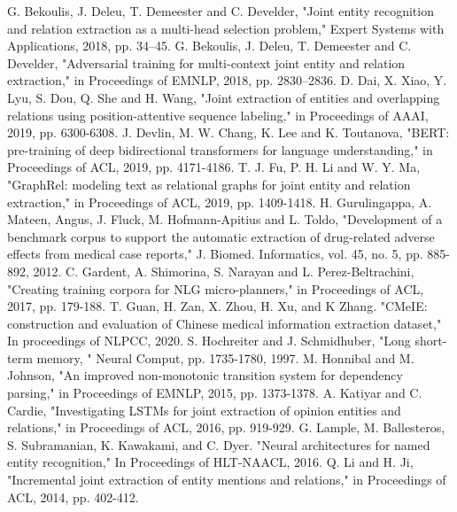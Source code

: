 \documentclass[conference]{IEEEtran}
\begin{document}
%
 \begin{thebibliography}{00}
 G. Bekoulis, J. Deleu, T. Demeester and C. Develder, "Joint entity recognition and relation extraction as a multi-head selection problem," Expert Systems with Applications, 2018, pp. 34--45.
 G. Bekoulis, J. Deleu, T. Demeester and C. Develder, "Adversarial training for multi-context joint entity and relation extraction," in Proceedings of EMNLP, 2018, pp. 2830--2836.
 D. Dai, X. Xiao, Y. Lyu, S. Dou, Q. She and H. Wang, "Joint extraction of entities and overlapping relations using position-attentive sequence labeling," in Proceedings of AAAI, 2019, pp. 6300-6308.
 J. Devlin, M. W. Chang, K. Lee and K. Toutanova, "BERT: pre-training of deep bidirectional transformers for language understanding," in Proceedings of ACL, 2019, pp. 4171-4186.
 T. J. Fu, P. H. Li and W. Y. Ma, "GraphRel: modeling text as relational graphs for joint entity and relation extraction," in Proceedings of ACL, 2019, pp. 1409-1418.
 H. Gurulingappa, A. Mateen, Angus, J. Fluck, M. Hofmann-Apitius and L. Toldo, "Development of a benchmark corpus to support the automatic extraction of drug-related adverse effects from medical case reports," J. Biomed. Informatics, vol. 45, no. 5, pp. 885-892, 2012.
 C. Gardent, A. Shimorina, S. Narayan and L. Perez-Beltrachini, "Creating training corpora for NLG micro-planners," in Proceedings of ACL, 2017, pp. 179-188.
 T. Guan, H. Zan, X. Zhou, H. Xu, and K Zhang. "CMeIE: construction and evaluation of Chinese medical information extraction dataset," In proceedings of NLPCC, 2020.
 S. Hochreiter and J. Schmidhuber, "Long short-term memory, " Neural Comput, pp. 1735-1780, 1997.
 M. Honnibal and M. Johnson, "An improved non-monotonic transition system for dependency parsing," in Proceedings of EMNLP, 2015, pp. 1373-1378.
 A. Katiyar and C. Cardie, "Investigating LSTMs for joint extraction of opinion entities and relations," in Proceedings of ACL, 2016, pp. 919-929.
 G. Lample, M. Ballesteros, S. Subramanian, K. Kawakami, and C. Dyer. "Neural architectures for named entity recognition," In Proceedings of HLT-NAACL, 2016.
 Q. Li and H. Ji, "Incremental joint extraction of entity mentions and relations," in Proceedings of ACL, 2014, pp. 402-412.

\end{thebibliography}
\end{document}
